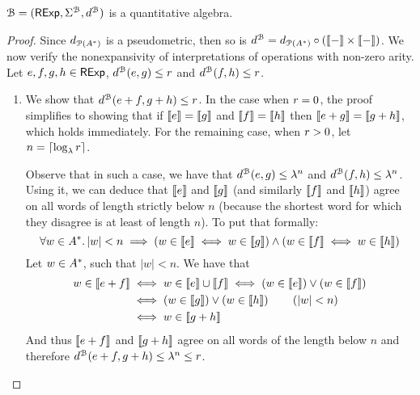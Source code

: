 \begin{lemma}\label{c2:lem:quantitative_algebra}
    $\mathcal{B} = (\mathsf{RExp}, \Sigma^{\mathcal{B}}, d^{\mathcal{B}})$ is a quantitative algebra.
\end{lemma}
\begin{proof}
Since $d_{\mathcal{P}({A}^{\ast})}$ is a pseudometric, then so is $d^{\mathcal{B}} = d_{\mathcal{P}({A}^{\ast})} \circ (\left\llbracket{-}\right\rrbracket\times\left\llbracket{-}\right\rrbracket)$. We now verify the nonexpansivity of interpretations of operations with non-zero arity. Let $e,f,g,h \in \mathsf{RExp}$, $d^{\mathcal{B}}(e,g) \leq r$ and $d^{\mathcal{B}}(f,h) \leq r$. 

\begin{enumerate}
    \item We show that $d^{\mathcal{B}}(e + f, g + h) \leq r$. In the case when $r = 0$, the proof simplifies to showing that if $\left\llbracket{e}\right\rrbracket = \left\llbracket{g}\right\rrbracket$ and $\left\llbracket{f}\right\rrbracket = \left\llbracket{h}\right\rrbracket$ then $\left\llbracket{e + g}\right\rrbracket = \left\llbracket{g + h}\right\rrbracket$, which holds immediately. 
    For the remaining case, when $r > 0$, let $n = \lceil \log_{\lambda} r \rceil$. 
    
    Observe that in such a case, we have that $d^{\mathcal{B}}(e,g) \leq \lambda^n$ and $d^{\mathcal{B}}(f,h) \leq \lambda^n$. Using it, we can deduce that $\left\llbracket{e}\right\rrbracket$ and $\left\llbracket{g}\right\rrbracket$ (and similarly $\left\llbracket{f}\right\rrbracket$ and $\left\llbracket{h}\right\rrbracket$) agree on all words of length strictly below $n$ (because the shortest word for which they disagree is at least of length $n$). To put that formally:
    $$\forall w \in {A}^{\ast} \ldotp |w| < n \implies \left(w \in \left\llbracket{e}\right\rrbracket \iff w \in \left\llbracket{g}\right\rrbracket \right) \wedge  \left(w \in \left\llbracket{f}\right\rrbracket \iff w \in \left\llbracket{h}\right\rrbracket \right) $$
    Let $w \in {A}^\ast$, such that $|w|<n$. We have that 
    \begin{align*}
        w \in \left\llbracket{e + f}\right\rrbracket &\iff w \in \left\llbracket{e}\right\rrbracket \cup \left\llbracket{f}\right\rrbracket \iff \left(w \in \left\llbracket{e}\right\rrbracket\right) \vee \left(w \in \left\llbracket{f}\right\rrbracket\right) \\
        &\iff \left(w \in \left\llbracket{g}\right\rrbracket\right) \vee \left(w \in \left\llbracket{h}\right\rrbracket\right) \tag{$|w| < n$} \\
        &\iff w \in \left\llbracket{g + h}\right\rrbracket
    \end{align*}
    And thus $\left\llbracket{e + f}\right\rrbracket$ and $\left\llbracket{g + h}\right\rrbracket$ agree on all words of the length below $n$ and therefore $d^{\mathcal{B}}(e + f, g + h) \leq \lambda^{n} \leq r$.
    

\end{enumerate}
\end{proof}
